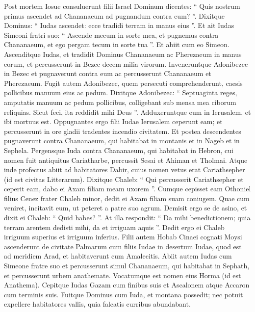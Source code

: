 \begin{biblechapter}
 \verse Post mortem Iosue consuluerunt filii Israel Dominum dicentes: “ Quis nostrum primus ascendet ad Chananaeum ad pugnandum contra eum? ”. 
\verse Dixitque Dominus: “ Iudas ascendet: ecce tradidi terram in manus eius ”. 
\verse Et ait Iudas Simeoni fratri suo: “ Ascende mecum in sorte mea, et pugnemus contra Chananaeum, et ego pergam tecum in sorte tua ”. Et abiit cum eo Simeon. 
\verse Ascenditque Iudas, et tradidit Dominus Chananaeum ac Pherezaeum in manus eorum, et percusserunt in Bezec decem milia virorum. 
\verse Inveneruntque Adonibezec in Bezec et pugnaverunt contra eum ac percusserunt Chananaeum et Pherezaeum. 
\verse Fugit autem Adonibezec, quem persecuti comprehenderunt, caesis pollicibus manuum eius ac pedum. 
\verse Dixitque Adonibezec: “ Septuaginta reges, amputatis manuum ac pedum pollicibus, colligebant sub mensa mea ciborum reliquias. Sicut feci, ita reddidit mihi Deus ”. Adduxeruntque eum in Ierusalem, et ibi mortuus est.
 \verse Oppugnantes ergo filii Iudae Ierusalem ceperunt eam; et percusserunt in ore gladii tradentes incendio civitatem.
 \verse Et postea descendentes pugnaverunt contra Chananaeum, qui habitabat in montanis et in Nageb et in Sephela. 
\verse Pergensque Iuda contra Chananaeum, qui habitabat in Hebron, cui nomen fuit antiquitus Cariatharbe, percussit Sesai et Ahiman et Tholmai. 
\verse Atque inde profectus abiit ad habitatores Dabir, cuius nomen vetus erat Cariathsepher (id est civitas Litterarum).
 \verse Dixitque Chaleb: “ Qui percusserit Cariathsepher et ceperit eam, dabo ei Axam filiam meam uxorem ”. 
\verse Cumque cepisset eam Othoniel filius Cenez frater Chaleb minor, dedit ei Axam filiam suam coniugem. 
\verse Quae cum veniret, incitavit eum, ut peteret a patre suo agrum. Demisit ergo se de asino, et dixit ei Chaleb: “ Quid habes? ”. 
\verse At illa respondit: “ Da mihi benedictionem; quia terram arentem dedisti mihi, da et irriguam aquis ”. Dedit ergo ei Chaleb irriguum superius et irriguum inferius.
 \verse Filii autem Hobab Cinaei cognati Moysi ascenderunt de civitate Palmarum cum filiis Iudae in desertum Iudae, quod est ad meridiem Arad, et habitaverunt cum Amalecitis.
 \verse Abiit autem Iudas cum Simeone fratre suo et percusserunt simul Chananaeum, qui habitabat in Sephath, et percusserunt urbem anathemate. Vocatumque est nomen eius Horma (id est Anathema). 
\verse Cepitque Iudas Gazam cum finibus suis et Ascalonem atque Accaron cum terminis suis. 
\verse Fuitque Dominus cum Iuda, et montana possedit; nec potuit expellere habitatores vallis, quia falcatis curribus abundabant. 

\end{biblechapter}

